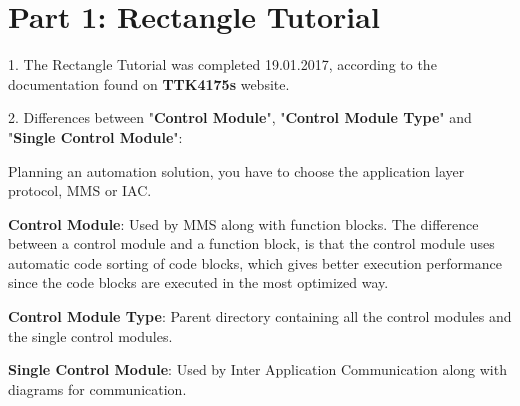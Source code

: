 \newpage
\section{Part 1: Rectangle Tutorial}

1. The Rectangle Tutorial was completed 19.01.2017, according to the documentation found on \textbf{TTK4175s} website.

2. Differences between "\textbf{Control Module}", "\textbf{Control Module Type}" and "\textbf{Single Control Module}":

Planning an automation solution, you have to choose the application layer protocol, MMS or IAC.

\textbf{Control Module}: Used by MMS along with function blocks. The difference between a control module and a function block, is that the control module uses automatic code sorting of code blocks, which gives better execution performance since the code blocks are executed in the most optimized way.

\textbf{Control Module Type}: Parent directory containing all the control modules and the single control modules.

\textbf{Single Control Module}: Used by Inter Application Communication along with diagrams for communication.
